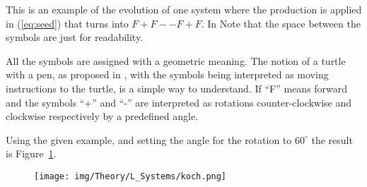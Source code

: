 
This is an example of the evolution of one system where the production is applied  in (\ref{eq:seed}) that turns into $F+F--F+F$. In Note that the space between the symbols are just for readability.

All the symbols are assigned with a geometric meaning. The notion of a turtle with a pen, as proposed in \cite{abelson1982aa}, with the symbols being interpreted as moving instructions to the turtle, is a simple way to understand. If ``F'' means forward and the symbols ``+'' and ``-'' are interpreted as rotations counter-clockwise and clockwise respectively by a predefined angle. 

Using the given example, and setting the angle for the rotation to $60^{\circ}$ the result is Figure~\ref{fig:kockLS}.

\begin{figure}[htbp]
   \centering
   \texttt{[image: img/Theory/L\_Systems/koch.png]}
   \caption{}
   \label{fig:kockLS}
\end{figure}





